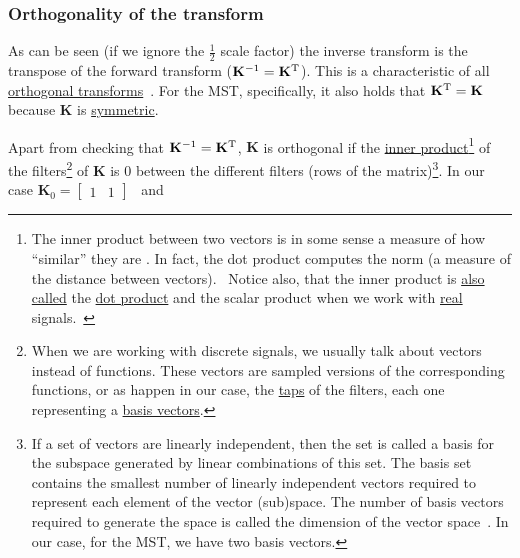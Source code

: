\subsubsection{Orthogonality of the transform}
As can be seen (if we ignore the $\frac{1}{2}$ scale factor)
the inverse transform is the transpose of the forward transform
(${\mathbf K}^{-1}={\mathbf K}^{\text T}$). This is a characteristic
of all
\href{https://en.wikipedia.org/wiki/Orthogonal_transformation}{orthogonal
  transforms}~\cite{sayood2017introduction}. For the MST,
specifically, it also holds that ${\mathbf K}^{\text T}={\mathbf K}$
because ${\mathbf K}$ is
\href{https://en.wikipedia.org/wiki/Symmetric_matrix}{symmetric}.

Apart from checking that ${\mathbf K}^{-1}={\mathbf K}^{\text T}$,
${\mathbf K}$ is orthogonal if the
\href{https://en.wikipedia.org/wiki/Inner_product_space}{inner
  product}\footnote{The inner product between two vectors is in some
  sense a measure of how ``similar'' they are
  \cite{sayood2017introduction}. In fact, the dot product computes the
  norm (a measure of the distance between
  vectors).~\cite{vetterli2014foundations} Notice also, that the inner
  product is
  \href{https://math.stackexchange.com/questions/476738/difference-between-dot-product-and-inner-product}{also
    called} the \href{https://en.wikipedia.org/wiki/Dot_product}{dot
    product} and the scalar product when we work with
  \href{https://en.wikipedia.org/wiki/Real_number}{real}
  signals.~\cite{vetterli2014foundations}} of the
filters\footnote{When we are working with discrete signals, we usually
  talk about vectors instead of functions. These vectors are sampled
  versions of the corresponding functions, or as happen in our case,
  the
  \href{https://en.wikipedia.org/wiki/Finite_impulse_response}{taps}
  of the filters, each one representing a
  \href{https://en.wikipedia.org/wiki/Basis_(linear_algebra)}{basis
    vectors}.} of ${\mathbf K}$ is $0$ between the different filters
(rows of the matrix)\footnote{If a set of vectors are linearly
  independent, then the set is called a basis for the subspace
  generated by linear combinations of this set. The basis set contains
  the smallest number of linearly independent vectors required to
  represent each element of the vector (sub)space. The number of basis
  vectors required to generate the space is called the dimension of
  the vector space~\cite{sayood2017introduction}. In our case, for the
  MST, we have two basis vectors.}. In our case
${\mathbf K}_0=\begin{bmatrix}1 & 1\end{bmatrix}$~ and
